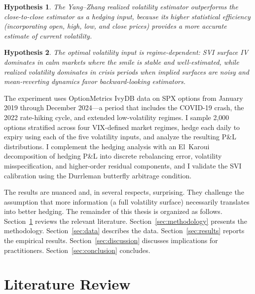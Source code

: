 \documentclass[12pt, letterpaper]{article}
\newtheorem{hypothesis}{Hypothesis}
\begin{document}
\begin{hypothesis}
\label{hyp:yz}
The Yang--Zhang realized volatility estimator outperforms the close-to-close estimator as a hedging input, because its higher statistical efficiency (incorporating open, high, low, and close prices) provides a more accurate estimate of current volatility.
\end{hypothesis}

\begin{hypothesis}
\label{hyp:regime}
The optimal volatility input is regime-dependent: SVI surface IV dominates in calm markets where the smile is stable and well-estimated, while realized volatility dominates in crisis periods when implied surfaces are noisy and mean-reverting dynamics favor backward-looking estimators.
\end{hypothesis}

The experiment uses OptionMetrics IvyDB data on SPX options from January 2019 through December 2024---a period that includes the COVID-19 crash, the 2022 rate-hiking cycle, and extended low-volatility regimes. I sample 2,000 options stratified across four VIX-defined market regimes, hedge each daily to expiry using each of the five volatility inputs, and analyze the resulting P\&L distributions. I complement the hedging analysis with an El~Karoui decomposition of hedging P\&L into discrete rebalancing error, volatility misspecification, and higher-order residual components, and I validate the SVI calibration using the Durrleman butterfly arbitrage condition.

The results are nuanced and, in several respects, surprising. They challenge the assumption that more information (a full volatility surface) necessarily translates into better hedging. The remainder of this thesis is organized as follows. Section~\ref{sec:literature} reviews the relevant literature. Section~\ref{sec:methodology} presents the methodology. Section~\ref{sec:data} describes the data. Section~\ref{sec:results} reports the empirical results. Section~\ref{sec:discussion} discusses implications for practitioners. Section~\ref{sec:conclusion} concludes.


\section{Literature Review}
\label{sec:literature}
\end{document}
